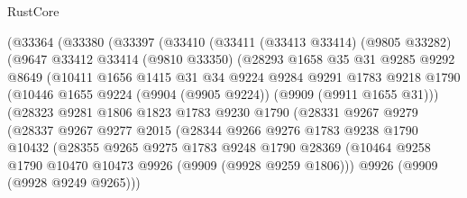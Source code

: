 \begin{lexlean}{RustCore}
\begin{coremodule}
            (@33364
              (@33380
                (@33397
                  (@33410
                    (@33411
                      (@33413 @33414)
                      (@9805 @33282)
                      (@9647
                        @33412
                        @33414
                        (@9810 @33350)
                        (@28293
                          @1658
                          @35
                          @31
                          @9285
                          @9292
                          @8649
                          (@10411
                            @1656
                            @1415
                            @31
                            @34
                            @9224
                            @9284
                            @9291
                            @1783
                            @9218
                            @1790
                            (@10446 @1655 @9224 (@9904 (@9905 @9224)) (@9909 (@9911 @1655 @31)))
                            (@28323
                              @9281
                              @1806
                              @1823
                              @1783
                              @9230
                              @1790
                              (@28331
                                @9267
                                @9279
                                (@28337
                                  @9267
                                  @9277
                                  @2015
                                  (@28344
                                    @9266
                                    @9276
                                    @1783
                                    @9238
                                    @1790
                                    @10432
                                    (@28355
                                      @9265
                                      @9275
                                      @1783
                                      @9248
                                      @1790
                                      @28369
                                      (@10464
                                        @9258
                                        @1790
                                        @10470
                                        @10473
                                        @9926
                                        (@9909 (@9928 @9259 @1806)))
                                      @9926
                                      (@9909 (@9928 @9249 @9265)))

\end{coremodule}
\end{lexlean}

